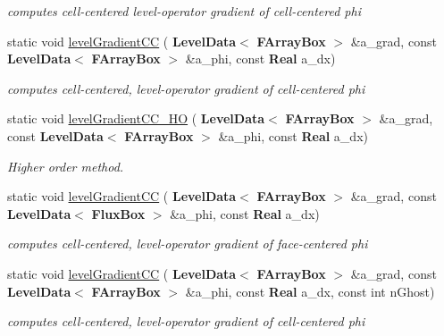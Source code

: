 \begin{DoxyCompactItemize}
\begin{DoxyCompactList}\small\item\em computes cell-\/centered level-\/operator gradient of cell-\/centered phi \end{DoxyCompactList}\item 
static void \hyperlink{class_gradient_a6103f7090b4d658cc1086f31a47474ba}{level\+Gradient\+CC} (\textbf{ Level\+Data}$<$ \textbf{ F\+Array\+Box} $>$ \&a\+\_\+grad, const \textbf{ Level\+Data}$<$ \textbf{ F\+Array\+Box} $>$ \&a\+\_\+phi, const \textbf{ Real} a\+\_\+dx)
\begin{DoxyCompactList}\small\item\em computes cell-\/centered, level-\/operator gradient of cell-\/centered phi \end{DoxyCompactList}\item 
\mbox{\label{class_gradient_a64c92cb13194902b86017a98cd73f775}} 
static void \hyperlink{class_gradient_a64c92cb13194902b86017a98cd73f775}{level\+Gradient\+C\+C\+\_\+\+HO} (\textbf{ Level\+Data}$<$ \textbf{ F\+Array\+Box} $>$ \&a\+\_\+grad, const \textbf{ Level\+Data}$<$ \textbf{ F\+Array\+Box} $>$ \&a\+\_\+phi, const \textbf{ Real} a\+\_\+dx)
\begin{DoxyCompactList}\small\item\em Higher order method. \end{DoxyCompactList}\item 
static void \hyperlink{class_gradient_a8962d5f7dabe25690dce34ce1c00726d}{level\+Gradient\+CC} (\textbf{ Level\+Data}$<$ \textbf{ F\+Array\+Box} $>$ \&a\+\_\+grad, const \textbf{ Level\+Data}$<$ \textbf{ Flux\+Box} $>$ \&a\+\_\+phi, const \textbf{ Real} a\+\_\+dx)
\begin{DoxyCompactList}\small\item\em computes cell-\/centered, level-\/operator gradient of face-\/centered phi \end{DoxyCompactList}\item 
static void \hyperlink{class_gradient_a476a6adb3c37375c48b60d91a3c9c949}{level\+Gradient\+CC} (\textbf{ Level\+Data}$<$ \textbf{ F\+Array\+Box} $>$ \&a\+\_\+grad, const \textbf{ Level\+Data}$<$ \textbf{ F\+Array\+Box} $>$ \&a\+\_\+phi, const \textbf{ Real} a\+\_\+dx, const int n\+Ghost)
\begin{DoxyCompactList}\small\item\em computes cell-\/centered, level-\/operator gradient of cell-\/centered phi \end{DoxyCompactList}\item 

\end{DoxyCompactItemize}
